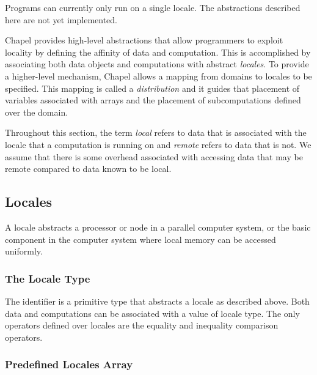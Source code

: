 \label{Locality_and_Distribution}

\begin{implementation}
Programs can currently only run on a single locale.  The abstractions
described here are not yet implemented.
\end{implementation}

Chapel provides high-level abstractions that allow programmers to
exploit locality by defining the affinity of data and computation.
This is accomplished by associating both data objects and computations
with abstract {\em locales}. To provide a higher-level mechanism,
Chapel allows a mapping from domains to locales to be specified. This
mapping is called a {\em distribution} and it guides that placement of
variables associated with arrays and the placement of subcomputations
defined over the domain.

Throughout this section, the term {\em local} refers to data that is
associated with the locale that a computation is running on and {\em
remote} refers to data that is not. We assume that there is some
overhead associated with accessing data that may be remote compared to
data known to be local.

\subsection{Locales}
\label{Locales}

A locale abstracts a processor or node in a parallel computer system,
or the basic component in the computer system where local memory can
be accessed uniformly.

\subsubsection{The Locale Type}
\label{The_Locale_Type}

The identifier  is a primitive type that abstracts a
locale as described above.  Both data and computations can be
associated with a value of locale type. The only operators defined
over locales are the equality and inequality comparison operators.

\subsubsection{Predefined Locales Array}
\label{Predefined_Locales_Array}

